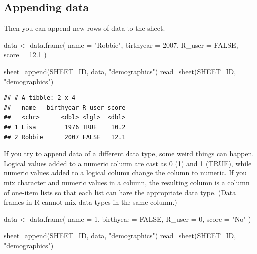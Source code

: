 \documentclass[
  oneside]{book}
\newenvironment{Shaded}{\begin{snugshade}}{\end{snugshade}}
\newcommand{\AttributeTok}[1]{\textcolor[rgb]{0.77,0.63,0.00}{#1}}
\newcommand{\ConstantTok}[1]{\textcolor[rgb]{0.00,0.00,0.00}{#1}}
\newcommand{\DecValTok}[1]{\textcolor[rgb]{0.00,0.00,0.81}{#1}}
\newcommand{\FloatTok}[1]{\textcolor[rgb]{0.00,0.00,0.81}{#1}}
\newcommand{\FunctionTok}[1]{\textcolor[rgb]{0.00,0.00,0.00}{#1}}
\newcommand{\NormalTok}[1]{#1}
\newcommand{\OtherTok}[1]{\textcolor[rgb]{0.56,0.35,0.01}{#1}}
\newcommand{\StringTok}[1]{\textcolor[rgb]{0.31,0.60,0.02}{#1}}
\begin{document}
\hypertarget{appending-data}{%
\subsection{Appending data}\label{appending-data}}

Then you can append new rows of data to the sheet.

\begin{Shaded}
\begin{Highlighting}[]
\NormalTok{data }\OtherTok{\textless{}{-}} \FunctionTok{data.frame}\NormalTok{(}
  \AttributeTok{name =} \StringTok{"Robbie"}\NormalTok{,}
  \AttributeTok{birthyear =} \DecValTok{2007}\NormalTok{,}
  \AttributeTok{R\_user =} \ConstantTok{FALSE}\NormalTok{,}
  \AttributeTok{score =} \FloatTok{12.1}
\NormalTok{)}

\FunctionTok{sheet\_append}\NormalTok{(SHEET\_ID, data, }\StringTok{"demographics"}\NormalTok{)}
\FunctionTok{read\_sheet}\NormalTok{(SHEET\_ID, }\StringTok{"demographics"}\NormalTok{)}
\end{Highlighting}
\end{Shaded}

\begin{verbatim}
## # A tibble: 2 x 4
##   name   birthyear R_user score
##   <chr>      <dbl> <lgl>  <dbl>
## 1 Lisa        1976 TRUE    10.2
## 2 Robbie      2007 FALSE   12.1
\end{verbatim}

If you try to append data of a different data type, some weird things can happen. Logical values added to a numeric column are cast as \DecValTok{0} (\DecValTok{1}) and \DecValTok{1} (\ConstantTok{TRUE}), while numeric values added to a logical column change the column to numeric. If you mix character and numeric values in a column, the resulting column is a column of one-item lists so that each list can have the appropriate data type. (Data frames in R cannot mix data types in the same column.)

\begin{Shaded}
\begin{Highlighting}[]
\NormalTok{data }\OtherTok{\textless{}{-}} \FunctionTok{data.frame}\NormalTok{(}
  \AttributeTok{name =} \DecValTok{1}\NormalTok{,}
  \AttributeTok{birthyear =} \ConstantTok{FALSE}\NormalTok{,}
  \AttributeTok{R\_user =} \DecValTok{0}\NormalTok{,}
  \AttributeTok{score =} \StringTok{"No"}
\NormalTok{)}

\FunctionTok{sheet\_append}\NormalTok{(SHEET\_ID, data, }\StringTok{"demographics"}\NormalTok{)}
\FunctionTok{read\_sheet}\NormalTok{(SHEET\_ID, }\StringTok{"demographics"}\NormalTok{)}
\end{Highlighting}
\end{Shaded}
\end{document}
